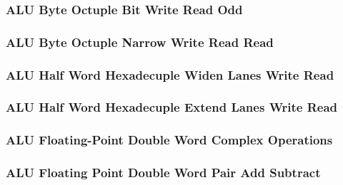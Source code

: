 \subsubsection[{\small ALU Byte Octuple Bit Write Read Odd}]{ALU Byte Octuple Bit Write Read Odd} \label{sec:format-ALU-BOBWRO}



\subsubsection[{\small ALU Byte Octuple Narrow Write Read Read}]{ALU Byte Octuple Narrow Write Read Read} \label{sec:format-ALU-BONWRR}



\subsubsection[{\small ALU Half Word Hexadecuple Widen Lanes Write Read}]{ALU Half Word Hexadecuple Widen Lanes Write Read} \label{sec:format-ALU-BXWIDEWR}



\subsubsection[{\small ALU Half Word Hexadecuple Extend Lanes Write Read}]{ALU Half Word Hexadecuple Extend Lanes Write Read} \label{sec:format-ALU-BXEXTLWR}



\subsubsection[{\small ALU Floating-Point Double Word Complex Operations}]{ALU Floating-Point Double Word Complex Operations} \label{sec:format-ALU-FDCOP}



\subsubsection[{\small ALU Floating Point Double Word Pair Add Subtract}]{ALU Floating Point Double Word Pair Add Subtract} \label{sec:format-ALU-FDPADD}

